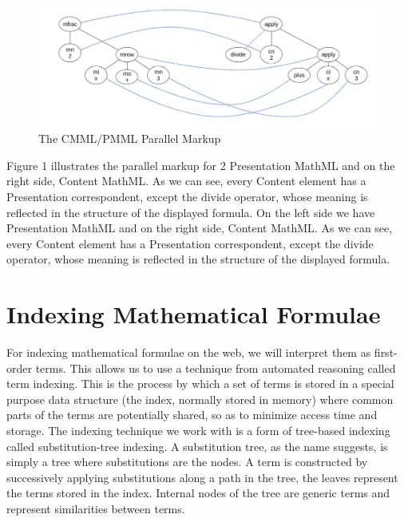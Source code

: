 \documentclass{deliverablereport}
\begin{document}
\begin{figure}[h]
\centering
 \includegraphics[scale=0.8]{figure2.jpg}
 \caption{The CMML/PMML Parallel Markup}
\end{figure}

Figure 1 illustrates the parallel markup for 2 Presentation MathML and on the right side, Content MathML. As we can see, every Content element has a Presentation correspondent, except the divide operator, whose meaning is reflected in the structure of the displayed formula. On the left side we have Presentation MathML and on the right side, Content MathML. As we can see, every Content element has a Presentation correspondent, except the divide operator, whose meaning is reflected in the structure of the displayed formula. \par



\section{Indexing Mathematical Formulae}\label{sec:mathindex}

For indexing mathematical formulae on the web, we will interpret them as first-order terms. This allows us to use a technique from automated reasoning called term indexing. This is the process by which a set of terms is stored in a special purpose data structure (the index, normally stored in memory) where common parts of the terms are potentially shared, so as to minimize access time and storage. The indexing technique we work with is a form of tree-based indexing called substitution-tree indexing. A substitution tree, as the name suggests, is simply a tree where substitutions are the nodes. A term is constructed by successively applying substitutions along a path in the tree, the leaves represent the terms stored in the index. Internal nodes of the tree are generic terms and represent similarities between terms. \par
\end{document}
